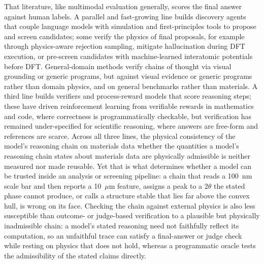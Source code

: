 \documentclass[pdflatex,sn-nature]{sn-jnl}
\newcommand{\rev}[1]{#1} %
\newcommand{\rev}[1]{{\color{blue}#1}} %
\providecommand{\DIFadd}[1]{{\protect\color{blue} \sf #1}} %
\providecommand{\DIFdel}[1]{{\protect\color{red} \scriptsize #1}} %
\providecommand{\DIFaddbegin}{} %
\providecommand{\DIFaddend}{} %
\providecommand{\DIFdelbegin}{} %
\providecommand{\DIFdelend}{} %
\providecommand{\DIFscaledelfig}{0.5}
\newlength{\DIFdelgraphicswidth} %
\newlength{\DIFdelgraphicsheight} %
\providecommand{\DIFaddincludegraphics}[2][]{{\color{blue}\fbox{\DIFOincludegraphics[#1]{#2}}}} %
\providecommand{\DIFdelincludegraphics}[2][]{%
\sbox{\DIFdelgraphicsbox}{\DIFOincludegraphics[#1]{#2}}%
\settoboxwidth{\DIFdelgraphicswidth}{\DIFdelgraphicsbox} %
\settoboxtotalheight{\DIFdelgraphicsheight}{\DIFdelgraphicsbox} %
\scalebox{\DIFscaledelfig}{%
\parbox[b]{\DIFdelgraphicswidth}{\usebox{\DIFdelgraphicsbox}\\[-\baselineskip] \rule{\DIFdelgraphicswidth}{0em}}\llap{\resizebox{\DIFdelgraphicswidth}{\DIFdelgraphicsheight}{%
\setlength{\unitlength}{\DIFdelgraphicswidth}%
\begin{picture}(1,1)%
\thicklines\linethickness{2pt} %
{\color[rgb]{1,0,0}\put(0,0){\framebox(1,1){}}}%
{\color[rgb]{1,0,0}\put(0,0){\line( 1,1){1}}}%
{\color[rgb]{1,0,0}\put(0,1){\line(1,-1){1}}}%
\end{picture}%
}\hspace*{3pt}}} %
} %
\DeclareRobustCommand{\DIFaddbegin}{\DIFOaddbegin \let\includegraphics\DIFaddincludegraphics} %
\DeclareRobustCommand{\DIFaddend}{\DIFOaddend \let\includegraphics\DIFOincludegraphics} %
\DeclareRobustCommand{\DIFdelbegin}{\DIFOdelbegin \let\includegraphics\DIFdelincludegraphics} %
\DeclareRobustCommand{\DIFdelend}{\DIFOaddend \let\includegraphics\DIFOincludegraphics} %
\begin{document}
That literature, like multimodal evaluation generally, scores the final answer
against human labels. A parallel and fast-growing line builds discovery agents that
couple language models with simulation and first-principles tools to propose and
screen candidates;\cite{dreams2025,crystalyse2025,mapps2025,atomagents2024,llmatdesign2024,matpc2025,kang2024chatmof,zhang2024honeycomb,survey2025aimat,eaa2026,matty2026}
some verify the physics of final proposals, for example through physics-aware
rejection sampling,\cite{physrej2025} mitigate hallucination during DFT
execution,\cite{dreams2025} or pre-screen candidates with machine-learned
interatomic potentials before DFT.\cite{genbaselines2025,chgnet2023} General-domain
methods verify chains of thought via visual grounding or generic
programs,\cite{corgi2025,mmverify2025,vlmr3_2026,prove2024} but against visual
evidence or generic programs rather than domain physics, and on general benchmarks
rather than materials. A third line builds verifiers and process-reward models that
score reasoning steps;\cite{processbench2025,compassverifier2025,t1verify2025} these
have driven reinforcement learning from verifiable rewards in mathematics and code,
where correctness is programmatically checkable,\cite{deepseekr1_2025} but
verification has remained under-specified for scientific reasoning, where answers are
free-form and references are scarce.\cite{scirlvr2026} Across all three lines, \DIFdelbegin \DIFdel{the
physical consistency of the model's reasoning chain on materials data }\DIFdelend \DIFaddbegin \DIFadd{\rev{whether
the quantities a model's reasoning chain states about materials data are physically
admissible} }\DIFaddend is neither
measured nor made reusable. Yet that is what
determines whether a model can be trusted inside an analysis or screening pipeline:
a chain that reads a 100~nm scale bar and then reports a 10~$\mu$m feature, assigns
a peak to a $2\theta$ the stated phase cannot produce, or calls a structure stable
that lies far above the convex hull, is wrong on its face. Checking the chain against
external physics is also less susceptible than outcome- or judge-based verification to a
plausible but physically inadmissible chain: a model's stated reasoning need not
faithfully reflect its computation, so an unfaithful trace can satisfy a final-answer or
judge check while resting on physics that does not hold, whereas a programmatic oracle
tests the admissibility of the stated claims directly.\cite{faithflow2026}
\end{document}
